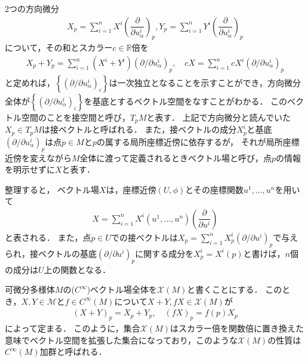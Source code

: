 \documentclass[dvipdfmx, a4paper,10pt]{jsarticle}
\theoremstyle{definition}
\newcommand{\eq}[1]{\begin{align}#1\end{align}}
\begin{document}
$2$つの方向微分
\eq{X_p=\sum_{i=1}^nX^i\left(\dfrac{\partial}{\partial u^i_\alpha}\right)_p,Y_p=\sum_{i=1}^nY^i\left(\dfrac{\partial}{\partial u^i_\alpha}\right)_p}
について，その和とスカラー$c\in\mathbb{R}$倍を
\eq{X_p+Y_p=\sum_{i=1}^n\left(X^i+Y^i\right)\left(\partial/\partial u^i_\alpha\right)_p,\quad cX=\sum_{i=1}^ncX^i\left(\partial/\partial u^i_\alpha\right)_p}
と定めれば，$\left\{\left(\partial/\partial u^i_\alpha\right)_i\right\}$は一次独立となることを示すことができ，方向微分全体が$\left\{\left(\partial/\partial u^i_\alpha\right)_i\right\}$を基底とするベクトル空間をなすことがわかる．
このベクトル空間のことを接空間と呼び，$T_pM$と表す．
上記で方向微分と読んでいた$X_p\in T_pM$は接ベクトルと呼ばれる．
また，接ベクトルの成分$X^i_p$と基底$(\partial/\partial u^i_\alpha)_p$は点$p\in M$と$p$の属する局所座標近傍に依存するが，
それが局所座標近傍を変えながら$M$全体に渡って定義されるときベクトル場と呼び，点$p$の情報を明示せずに$X$と表す．


整理すると，
ベクトル場$X$は，座標近傍$(U,\phi)$とその座標関数$u^1,...,u^n$を用いて
\eq{X=\sum_{i=1}^nX^i(u^1,...,u^n)\left(\dfrac{\partial}{\partial u^i}\right)\label{VectorField1}}
と表される．
また，点$p\in U$での接ベクトルは$X_p=\sum_{i=1}^nX^i_p(\partial/\partial u^i)_p$で与えられ，接ベクトルの基底$(\partial/\partial u^i)_p$に関する成分を$X^i_p=X^i(p)$と書けば，$n$個の成分は$U$上の関数となる．

可微分多様体$M$の($C^\infty$)ベクトル場全体を$\mathscr{X}(M)$と書くことにする．
このとき，$X,Y\in\mathscr{M}$と$f\in C^\infty(M)$について$X+Y,fX\in\mathscr{X}(M)$が
\eq{(X+Y)_p=X_p+Y_p,\quad (fX)_p=f(p)X_p}
によって定まる．
このように，集合$\mathscr{X}(M)$はスカラー倍を関数倍に置き換えた意味でベクトル空間を拡張した集合になっており，このような$\mathscr{X}(M)$の性質は$C^\infty(M)$加群と呼ばれる．
\end{document}
